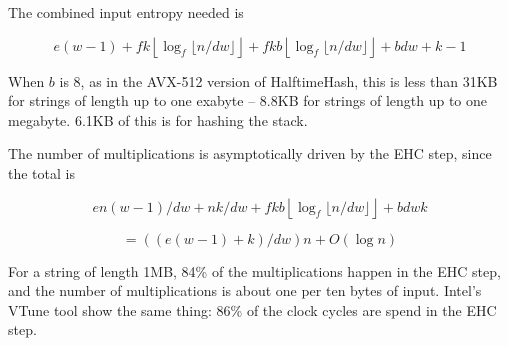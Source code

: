 \documentclass[sigconf, nonacm]{acmart}
\begin{document}
The combined input entropy needed is

\[
e(w-1)
+ f k \left\lfloor\log_f \lfloor n/dw\rfloor\right\rfloor
+ f k b \left\lfloor\log_f \lfloor n/dw\rfloor\right\rfloor
+ b d w + k - 1
\]

When $b$ is 8, as in the AVX-512 version of HalftimeHash, this is less than 31KB for strings of length up to one exabyte -- 8.8KB for strings of length up to one megabyte.
6.1KB of this is for hashing the stack.

The number of multiplications is asymptotically driven by the EHC step, since the total is

\[
en(w-1)/dw + nk/dw + f k b \left\lfloor\log_f \lfloor n/dw\rfloor\right\rfloor + b d w k
\]

\[
= ((e(w-1) + k)/dw)n + O(\log n)
\]

For a string of length 1MB, 84\% of the multiplications happen in the EHC step, and the number of multiplications is about one per ten bytes of input.
Intel's VTune tool show the same thing: 86\% of the clock cycles are spend in the EHC step.







\end{document}
